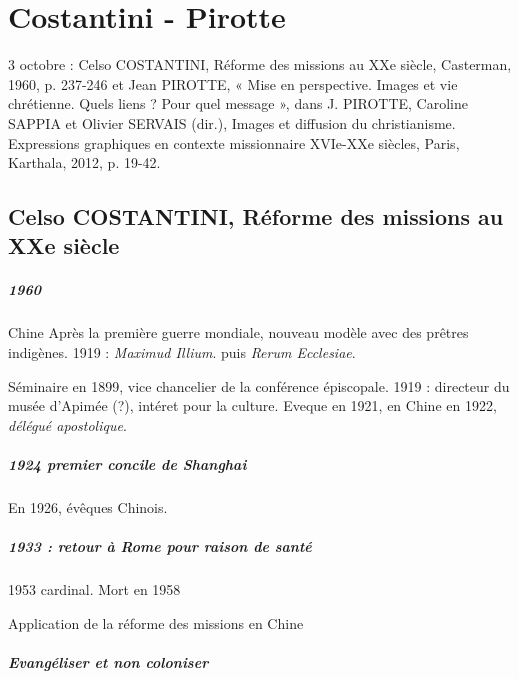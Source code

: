 \chapter{Costantini - Pirotte}

	3 octobre : Celso COSTANTINI, Réforme des missions au XXe siècle, Casterman, 1960, p. 237-246 et Jean PIROTTE, « Mise en perspective. Images et vie chrétienne. Quels liens ? Pour quel message », dans J. PIROTTE, Caroline SAPPIA et Olivier SERVAIS (dir.), Images et diffusion du christianisme. Expressions graphiques en contexte missionnaire XVIe-XXe siècles, Paris, Karthala, 2012, p. 19-42. 


\section{Celso COSTANTINI, Réforme des missions au XXe siècle}

\paragraph{1960} Chine
Après la première guerre mondiale, nouveau modèle avec des prêtres indigènes. 1919 : \textit{Maximud Illium}. puis \textit{Rerum Ecclesiae}. 

Séminaire en 1899, vice chancelier de la conférence épiscopale. 1919 : directeur du musée d'Apimée (?), intéret pour la culture. Eveque en 1921, en Chine en 1922, \textit{délégué apostolique}. 

\paragraph{1924 premier concile de Shanghai} En 1926, évêques Chinois.

\paragraph{1933 : retour à Rome pour raison de santé} 1953 cardinal. Mort en 1958

\begin{Synthesis}
    Application de la réforme des missions en Chine
\end{Synthesis}



\paragraph{Evangéliser et non coloniser} 

